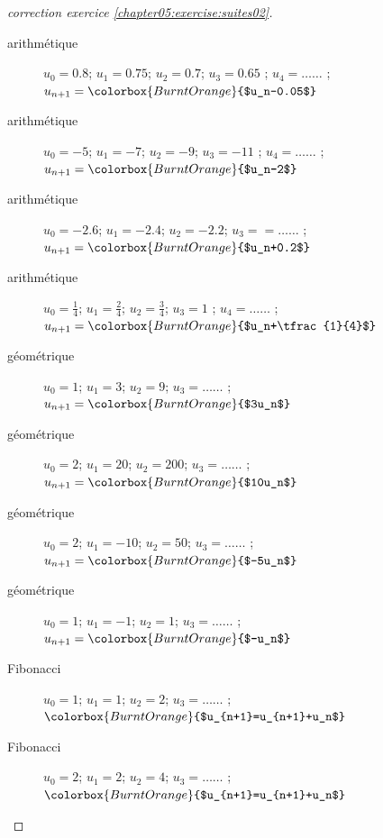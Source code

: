 \documentclass[main.tex]{subfiles}
\begin{document}
\begin{proof}[correction exercice \ref{chapter05:exercise:suites02}] \hfill 
\begin{spacing}{2}
\vspace{-1.0em}
\begin{description} 
	\item[arithmétique] $u_0=0.8$; $u_1=0.75$; $u_2=0.7$; $u_3=0.65$ ; $u_4=\ldots\ldots$  ;  \hfill  {$u_{n+1}=\colorbox{BurntOrange}{$u_n-0.05$} $} 
	\item[arithmétique] $u_0=-5$; $u_1=-7$; $u_2=-9$; $u_3=-11$ ; $u_4=\ldots\ldots$  ;  \hfill  {$u_{n+1}=\colorbox{BurntOrange}{$u_n-2$} $} 
	\item[arithmétique] $u_0=-2.6$; $u_1=-2.4$; $u_2=-2.2$; $u_3==\ldots\ldots$ ;    \hfill  {$u_{n+1}=\colorbox{BurntOrange}{$u_n+0.2$} $} 
	\item[arithmétique] $u_0=\tfrac{1}{4}$; $u_1=\tfrac{2}{4}$; $u_2=\tfrac{3}{4}$; $u_3=1$ ; $u_4=\ldots\ldots$  ;  \hfill  {$u_{n+1}=\colorbox{BurntOrange}{$u_n+\tfrac{1}{4}$} $} 
	\item[géométrique] $u_0=1$; $u_1=3$; $u_2=9$; $u_3= \ldots\ldots$  ;  \hfill  {$u_{n+1}=\colorbox{BurntOrange}{$3u_n$} $}
	\item[géométrique] $u_0=2$; $u_1=20$; $u_2=200$; $u_3= \ldots\ldots$  ;  \hfill  {$u_{n+1}=\colorbox{BurntOrange}{$10u_n$} $}
	\item[géométrique] $u_0=2$; $u_1=-10$; $u_2=50$; $u_3= \ldots\ldots$  ;  \hfill  {$u_{n+1}=\colorbox{BurntOrange}{$-5u_n$} $}
	\item[géométrique] $u_0=1$; $u_1=-1$; $u_2=1$; $u_3= \ldots\ldots$  ;  \hfill  {$u_{n+1}=\colorbox{BurntOrange}{$-u_n$} $}
	\item[Fibonacci] $u_0=1$; $u_1=1$; $u_2=2$; $u_3= \ldots\ldots$  ;  \hfill  {$\colorbox{BurntOrange}{$u_{n+1}=u_{n+1}+u_n$} $}
	\item[Fibonacci] $u_0=2$; $u_1=2$; $u_2=4$; $u_3= \ldots\ldots$  ;  \hfill  {$ \colorbox{BurntOrange}{$u_{n+1}=u_{n+1}+u_n$}  $}
\end{description} 
\end{spacing}\vspace{-0.5em}
\end{proof}
\end{document}
